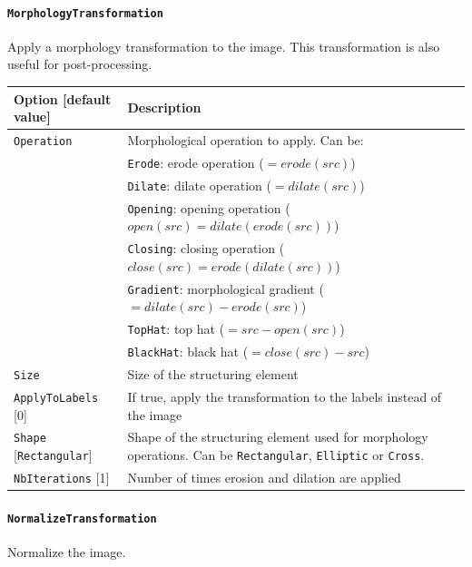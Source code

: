\documentclass[a4paper,11pt,oneside]{article}
\newcommand{\iponly}{\reversemarginpar
    \marginnote{\color{listletiblue}\normalfont\scriptsize
    {\ttfamily{}\hyperref[sec:N2D2-IP]{\color{listletiblue}N2D2 IP}} \emph{only}}}
\begin{document}
\paragraph{\texorpdfstring{\lstinline[basicstyle=\ttfamily\bfseries]!MorphologyTransformation!\protect\iponly}
{MorphologyTransformation}}
Apply a morphology transformation to the image.
This transformation is also useful for post-processing.

\begin{center}
 \begin{tabular}{| p{5cm} | p{10cm} | }
 \hline
 Option [default value] & Description\\
 \hline\hline
  \cellcolor{requiredcolor}\lstinline!Operation! & Morphological operation to
  apply. Can be:\\
   & \lstinline!Erode!: erode operation ($=erode(src)$) \\
   & \lstinline!Dilate!: dilate operation ($=dilate(src)$) \\
   & \lstinline!Opening!: opening operation ($open(src)=dilate(erode(src))$) \\
   & \lstinline!Closing!: closing operation ($close(src)=erode(dilate(src))$) \\
   & \lstinline!Gradient!: morphological gradient ($=dilate(src)-erode(src)$) \\
   & \lstinline!TopHat!: top hat ($=src-open(src)$) \\
   & \lstinline!BlackHat!: black hat ($=close(src)-src$) \\
  \cellcolor{requiredcolor}\lstinline!Size! & Size of the structuring element \\
  \lstinline!ApplyToLabels! [0] & If true, apply the transformation to the
  labels instead of the image \\
  \lstinline!Shape! [\lstinline!Rectangular!] & Shape of the structuring element
   used for morphology operations. Can be \lstinline!Rectangular!,
   \lstinline!Elliptic! or \lstinline!Cross!. \\
  \lstinline!NbIterations! [1] & Number of times erosion and dilation are
  applied \\
 \hline
\end{tabular}
\end{center}


\paragraph{\texorpdfstring{\lstinline[basicstyle=\ttfamily\bfseries]!NormalizeTransformation!}{NormalizeTransformation}}
Normalize the image.
\end{document}
